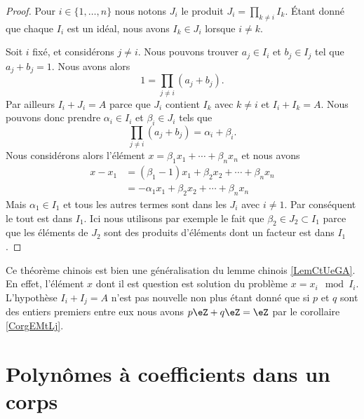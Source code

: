 \begin{proof}
    Pour \( i\in\{ 1,\ldots,n \}\) nous notons \( J_i\) le produit \( J_i=\prod_{k\neq i}I_k\). Étant donné que chaque \( I_i\) est un idéal, nous avons \( I_k\in J_i\) lorsque \( i\neq k\).

    Soit \( i\) fixé, et considérons \( j\neq i\). Nous pouvons trouver \( a_j\in I_i\) et \( b_j\in I_j\) tel que \( a_j+b_j=1\). Nous avons alors
    \begin{equation}
        1=\prod_{j\neq i}(a_j+b_j).
    \end{equation}
    Par ailleurs \( I_i+J_i=A\) parce que \( J_i\) contient \( I_k\) avec \( k\neq i\) et \( I_i+I_k=A\). Nous pouvons donc prendre \( \alpha_i\in I_i\) et \( \beta_i\in J_i\) tels que
    \begin{equation}
        \prod_{j\neq i}(a_j+b_j)=\alpha_i+\beta_i.
    \end{equation}
    Nous considérons alors l'élément \( x=\beta_1x_1+\cdots+\beta_nx_n\) et nous avons
    \begin{subequations}
        \begin{align}
            x-x_1&=(\beta_1-1)x_1+\beta_2x_2+\cdots+\beta_nx_n\\
            &=-\alpha_1x_1+\beta_2x_2+\cdots+\beta_nx_n
        \end{align}
    \end{subequations}
    Mais \( \alpha_1\in I_1\) et tous les autres termes sont dans les \( J_i\) avec \( i\neq 1\). Par conséquent le tout est dans \( I_1\). Ici nous utilisons par exemple le fait que \( \beta_2\in J_2\subset I_1\) parce que les éléments de \( J_2\) sont des produits d'éléments dont un facteur est dans \( I_1\).
\end{proof}

\begin{remark}
    Ce théorème chinois est bien une généralisation du lemme chinois \ref{LemCtUeGA}. En effet, l'élément \( x\) dont il est question est solution du problème \( x=x_i\mod I_i\). L'hypothèse \( I_i+I_j=A\) n'est pas nouvelle non plus étant donné que si \( p\) et \( q\) sont des entiers premiers entre eux nous avons \( p\eZ+q\eZ=\eZ\) par le corollaire \ref{CorgEMtLj}.
\end{remark}

\section{Polynômes à coefficients dans un corps}
\label{SECooFYOGooQHitgE}

